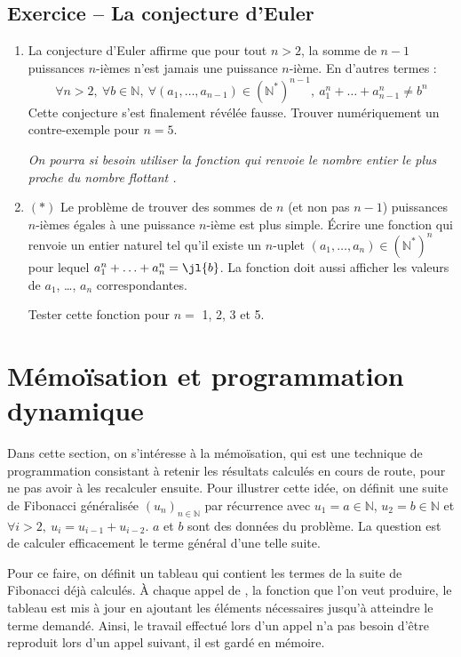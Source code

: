 \documentclass{article}
\newcounter{loop}
\newcounter{numEx}
\newcommand{\exo}[1]{
	\stepcounter{numEx}
	\setcounter{loop}{0}
	\subsection*{Exercice \arabic{numEx} -- #1}
}
\newcommand{\paren}[1]{\ensuremath{\left(#1\right)}}
\newcommand{\seq}[3]{\ensuremath{\left(#1_{#2}\right)_{#2\in#3}}}
\newcommand{\N}{\mathbb{N}}
\begin{document}
\exo{La conjecture d'Euler}

\begin{enumerate}
	\item La conjecture d'Euler affirme que pour tout $n>2$, la somme de $n-1$ puissances $n$-ièmes n'est jamais une puissance $n$-ième. En d'autres termes :\vspace{-0.5em}
	\[\forall n>2,\ \forall b\in\N,\ \forall (a_1, \ldots, a_{n-1})\in\paren{\N^*}^{n-1},\ a_1^n + \ldots + a_{n-1}^n \neq b^n\]
	Cette conjecture s'est finalement révélée fausse. Trouver numériquement un contre-exemple pour $n = 5$.
	
	\textsl{On pourra si besoin utiliser la fonction  qui renvoie le nombre entier le plus proche du nombre flottant .}

	\item $(*)$ Le problème de trouver des sommes de $n$ (et non pas $n-1$) puissances $n$-ièmes égales à une puissance $n$-ième est plus simple. Écrire une fonction  qui renvoie un entier naturel  tel qu'il existe un $n$-uplet $(a_1, \ldots, a_n)\in\paren{\N^*}^n$ pour lequel $a_1^n + \ldots + a_n^n = \jl{b}$. La fonction doit aussi afficher les valeurs de $a_1$, \ldots, $a_n$ correspondantes.

	Tester cette fonction pour $n = $ 1, 2, 3 et 5.
\end{enumerate}


\section{Mémoïsation et programmation dynamique}

Dans cette section, on s'intéresse à la mémoïsation, qui est une technique de programmation consistant à retenir les résultats calculés en cours de route, pour ne pas avoir à les recalculer ensuite. Pour illustrer cette idée, on définit une suite de Fibonacci généralisée $\seq un\N$ par récurrence avec $u_1 = a\in\N$, $u_2 = b\in\N$ et $\forall i>2,\ u_i = u_{i-1} + u_{i-2}$. $a$ et $b$ sont des données du problème. La question est de calculer efficacement le terme général d'une telle suite.

Pour ce faire, on définit un tableau  qui contient les termes de la suite de Fibonacci déjà calculés. À chaque appel de , la fonction que l'on veut produire, le tableau est mis à jour en ajoutant les éléments nécessaires jusqu'à atteindre le terme  demandé. Ainsi, le travail effectué lors d'un appel n'a pas besoin d'être reproduit lors d'un appel suivant, il est gardé en mémoire.
\end{document}
